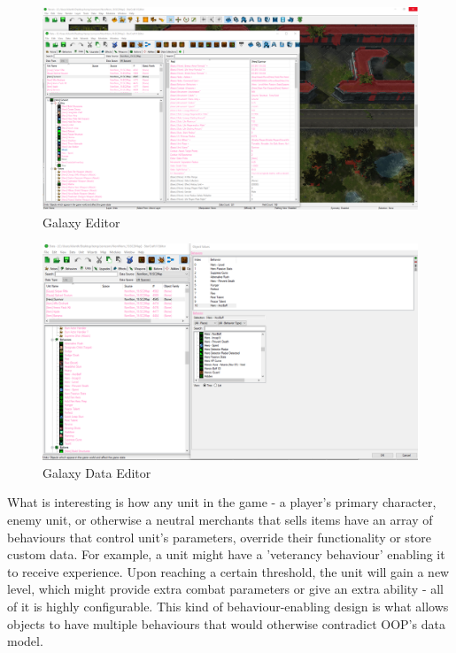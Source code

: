 \documentclass{article}
\begin{document}
\begin{figure}[H]
    \centering
    \includegraphics[width=1\textwidth]{galaxy_overview.PNG}
    \caption{Galaxy Editor}
    \label{fig:galaxy1}
\end{figure}

\begin{figure}[H]
    \centering
    \includegraphics[width=1\textwidth]{galaxy_behaviours.PNG}
    \caption{Galaxy Data Editor}
    \label{fig:galaxy2}
\end{figure}

What is interesting is how any unit in the game - a player's primary character, enemy unit, or otherwise a neutral merchants that sells items have an array of behaviours that control unit's parameters, override their functionality or store custom data. For example, a unit might have a 'veterancy behaviour' enabling it to receive experience. Upon reaching a certain threshold, the unit will gain a new level, which might provide extra combat parameters or give an extra ability - all of it is highly configurable.
This kind of behaviour-enabling design is what allows objects to have multiple behaviours that would otherwise contradict OOP's data model. 
\end{document}
